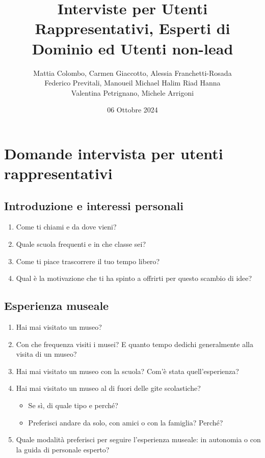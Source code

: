 \documentclass[a4paper, 12pt]{article}
\title{Interviste per Utenti Rappresentativi, Esperti di Dominio ed Utenti non-lead}
\author{Mattia Colombo, Carmen Giaccotto, Alessia Franchetti-Rosada \\Federico Previtali, Manoueil Michael Halim Riad Hanna \\ Valentina Petrignano, Michele Arrigoni}
\date{06 Ottobre 2024}
\begin{document}
\maketitle

\section{\textcolor{sectioncolor}{Domande intervista per utenti \\rappresentativi}}

\subsection{\textcolor{subsectioncolor}{Introduzione e interessi personali}}
\begin{enumerate}[label=\textcolor{textcolor}{\arabic*.}]
    \item \textcolor{textcolor}{Come ti chiami e da dove vieni?}
    \item \textcolor{textcolor}{Quale scuola frequenti e in che classe sei?}
    \item \textcolor{textcolor}{Come ti piace trascorrere il tuo tempo libero?}
    \item \textcolor{textcolor}{Qual è la motivazione che ti ha spinto a offrirti per questo scambio di idee?}
\end{enumerate}

\subsection{\textcolor{subsectioncolor}{Esperienza museale}}
\begin{enumerate}[label=\textcolor{textcolor}{\arabic*.}]
    \item \textcolor{textcolor}{Hai mai visitato un museo?}
    \item \textcolor{textcolor}{Con che frequenza visiti i musei? E quanto tempo dedichi generalmente alla visita di un museo?}
    \item \textcolor{textcolor}{Hai mai visitato un museo con la scuola? Com’è stata quell’esperienza?}
    \item \textcolor{textcolor}{Hai mai visitato un museo al di fuori delle gite scolastiche?}
    \begin{itemize}
        \item \textcolor{textcolor}{Se sì, di quale tipo e perché?}
        \item \textcolor{textcolor}{Preferisci andare da solo, con amici o con la famiglia? Perché?}
    \end{itemize}
    \item \textcolor{textcolor}{Quale modalità preferisci per seguire l'esperienza museale: in autonomia o con la guida di personale esperto?}
\end{enumerate}
\end{document}
